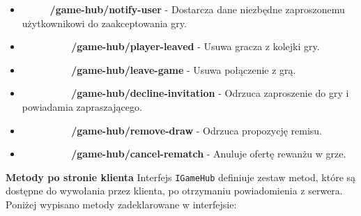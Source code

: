 \documentclass[twoside]{projektInzynierskiMS1}
\begin{document}
\begin{itemize}
    \item \textbf{\colorbox{cyan!90}{\textcolor{white}{GET}} /game-hub/notify-user} - Dostarcza dane niezbędne zaproszonemu użytkownikowi do zaakceptowania gry.
    \item \textbf{\colorbox{red!90}{\textcolor{white}{DELETE}} /game-hub/player-leaved} - Usuwa gracza z kolejki gry.
    \item \textbf{\colorbox{red!90}{\textcolor{white}{DELETE}} /game-hub/leave-game} - Usuwa połączenie z grą.
    \item \textbf{\colorbox{red!90}{\textcolor{white}{DELETE}} /game-hub/decline-invitation} - Odrzuca zaproszenie do gry i powiadamia zapraszającego.
    \item \textbf{\colorbox{red!90}{\textcolor{white}{DELETE}} /game-hub/remove-draw} - Odrzuca propozycję remisu.
    \item \textbf{\colorbox{red!90}{\textcolor{white}{DELETE}} /game-hub/cancel-rematch} - Anuluje ofertę rewanżu w grze.
\end{itemize}

\newpage

\noindent \textbf{Metody po stronie klienta}
Interfejs \texttt{IGameHub} definiuje zestaw metod, które są dostępne do wywołania przez klienta, po otrzymaniu powiadomienia z serwera. Poniżej wypisano metody zadeklarowane w interfejsie:
\end{document}

